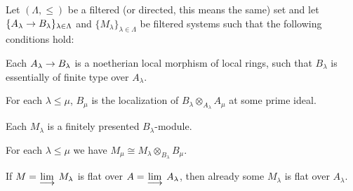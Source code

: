 \documentclass[a4paper,parskip=half,numbers=enddot, DIV=12]{scrreprt}
\renewcommand{\leq}{\leqslant}
\begin{document}
\begin{lem}
	Let $(\Lambda,\leq)$ be a filtered (or directed, this means the same) set and let $\{A_\lambda\morphism B_\lambda\}_{\lambda\in\Lambda}$ and $\{M_\lambda\}_{\lambda\in\Lambda}$ be filtered systems such that the following conditions hold:
	\begin{ordnumerate}
		\item Each $A_\lambda\morphism B_\lambda$ is a noetherian local morphism of local rings, such that $B_\lambda$ is essentially of finite type over $A_\lambda$. 
		\item For each $\lambda\leq\mu$, $B_\mu$ is the localization of $B_\lambda\otimes_{A_\lambda}A_\mu$ at some prime ideal.
		\item Each $M_\lambda$ is a finitely presented $B_\lambda$-module.
		\item For each $\lambda\leq \mu$ we have $M_\mu\cong M_\lambda\otimes_{B_\lambda}B_\mu$.
	\end{ordnumerate}
	If $M=\colimit M_\lambda$ is flat over $A=\colimit A_\lambda$, then already some $M_\lambda$ is flat over $A_\lambda$.
\end{lem}
\end{document}
